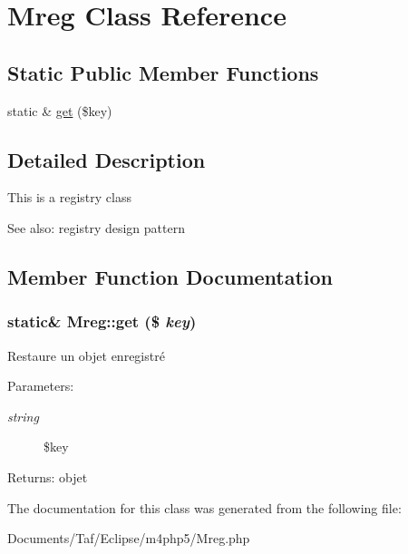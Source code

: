 \hypertarget{classMreg}{
\section{Mreg Class Reference}
\label{classMreg}
}
\subsection*{Static Public Member Functions}
\begin{CompactItemize}
\item 
static \& \hyperlink{classMreg_3ad29ff7870610b5e96b35941fe34e91}{get} (\$key)
\end{CompactItemize}


\subsection{Detailed Description}
This is a registry class \begin{Desc}
\item[See also:]registry design pattern \end{Desc}


\subsection{Member Function Documentation}
\hypertarget{classMreg_3ad29ff7870610b5e96b35941fe34e91}{
\subsubsection[get]{\setlength{\rightskip}{0pt plus 5cm}static\& Mreg::get (\$ {\em key})}}
\label{classMreg_3ad29ff7870610b5e96b35941fe34e91}


Restaure un objet enregistré

\begin{Desc}
\item[Parameters:]
\begin{description}
\item[{\em string}]\$key \end{description}
\end{Desc}
\begin{Desc}
\item[Returns:]objet \end{Desc}


The documentation for this class was generated from the following file:\begin{CompactItemize}
\item 
Documents/Taf/Eclipse/m4php5/Mreg.php\end{CompactItemize}
